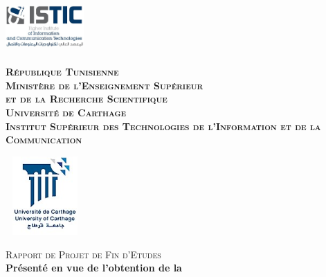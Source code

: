 \begin{titlepage}

\newcommand{\HRule}{\rule{\linewidth}{0.5mm}} %

\center %
 


\begin{minipage}[l]{0.2\columnwidth}
\includegraphics[width=3cm,height=2cm]{logo_istic.jpg}\\
\end{minipage}
\hfill
\begin{minipage}[l]{0.5\columnwidth}
\centering
\footnotesize
\textbf{\textsc{République Tunisienne}}\\
\textbf{\textsc{Ministère de l'Enseignement Supérieur\\
et de la Recherche Scientifique}}\\
\medskip 
\textbf{\textsc{Université de Carthage}}\\
\medskip 
\textbf{\textsc{Institut Supérieur des Technologies de l'Information et de la Communication}}
\end{minipage}
\hfill
\begin{minipage}[l]{0.2\columnwidth}
\includegraphics[width=3cm,height=3cm]{universite-carthage.jpg}\\
\end{minipage}

\vskip1cm
\textsc{\large Rapport de Projet de Fin d'Etudes}\\[0.5cm] %

\textbf{Présenté en vue de l'obtention de la}


\end{titlepage}
